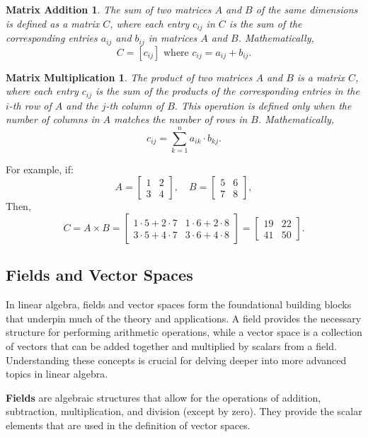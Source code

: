 \newtheorem*{mxa}{Matrix Addition}
\begin{mxa}
The sum of two matrices $A$ and $B$ of the same dimensions is defined as a matrix $C$, where each entry $c_{ij}$ in $C$ is the sum of the corresponding entries $a_{ij}$ and $b_{ij}$ in matrices $A$ and $B$. Mathematically, 
\[
C = [c_{ij}] \text{ where } c_{ij} = a_{ij} + b_{ij}.
\]
\end{mxa}

\newtheorem*{mxm}{Matrix Multiplication}
\begin{mxm} 
The product of two matrices $A$ and $B$ is a matrix $C$, where each entry $c_{ij}$ is the sum of the products of the corresponding entries in the $i$-th row of $A$ and the $j$-th column of $B$. This operation is defined only when the number of columns in $A$ matches the number of rows in $B$. Mathematically,
\[
c_{ij} = \sum_{k=1}^{n} a_{ik} \cdot b_{kj}.
\]
\end{mxm}

For example, if:
\[
A = \begin{bmatrix}
1 & 2 \\
3 & 4
\end{bmatrix}, \quad
B = \begin{bmatrix}
5 & 6 \\
7 & 8
\end{bmatrix},
\]
Then,
\[
C = A \times B = \begin{bmatrix}
1 \cdot 5 + 2 \cdot 7 & 1 \cdot 6 + 2 \cdot 8 \\
3 \cdot 5 + 4 \cdot 7 & 3 \cdot 6 + 4 \cdot 8
\end{bmatrix} = \begin{bmatrix}
19 & 22 \\
41 & 50
\end{bmatrix}.
\]

\subsection{Fields and Vector Spaces}
In linear algebra, fields and vector spaces form the foundational building blocks that underpin much of the theory and applications. A field provides the necessary structure for performing arithmetic operations, while a vector space is a collection of vectors that can be added together and multiplied by scalars from a field. Understanding these concepts is crucial for delving deeper into more advanced topics in linear algebra.

\textbf{Fields} are algebraic structures that allow for the operations of addition, subtraction, multiplication, and division (except by zero). They provide the scalar elements that are used in the definition of vector spaces.

